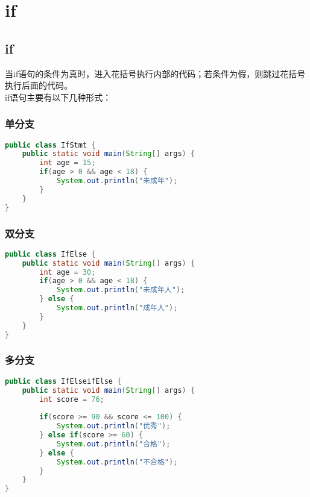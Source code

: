 \newpage

\section{if}

\subsection{if}

当if语句的条件为真时，进入花括号执行内部的代码；若条件为假，则跳过花括号执行后面的代码。\\

if语句主要有以下几种形式：

\subsubsection{单分支}

\vspace{-1cm}

\begin{lstlisting}[language=Java]
public class IfStmt {
	public static void main(String[] args) {
		int age = 15;
		if(age > 0 && age < 18) {
			System.out.println("未成年");
		}
	}
}
\end{lstlisting}

\subsubsection{双分支}

\vspace{-1cm}

\begin{lstlisting}[language=Java]
public class IfElse {
	public static void main(String[] args) {
		int age = 30;
		if(age > 0 && age < 18) {
			System.out.println("未成年人");
		} else {
			System.out.println("成年人");
		}
	}
}
\end{lstlisting}

\subsubsection{多分支}

\vspace{-1cm}

\begin{lstlisting}[language=Java]
public class IfElseifElse {
	public static void main(String[] args) {
		int score = 76;
			
		if(score >= 90 && score <= 100) {
			System.out.println("优秀");
		} else if(score >= 60) {
			System.out.println("合格");
		} else {
			System.out.println("不合格");
		}
	}
}
\end{lstlisting}

